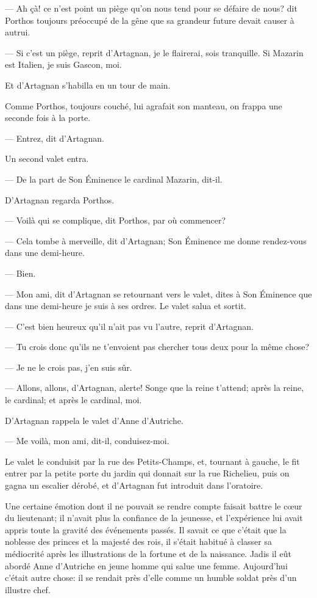 — Ah çà! ce n'est point un piège qu'on nous tend pour se défaire de nous? dit Porthos toujours préoccupé de la gêne que sa grandeur future devait causer à autrui.

— Si c'est un piège, reprit d'Artagnan, je le flairerai, sois tranquille. Si Mazarin est Italien, je suis Gascon, moi.

Et d'Artagnan s'habilla en un tour de main.

Comme Porthos, toujours couché, lui agrafait son manteau, on frappa une seconde fois à la porte.

— Entrez, dit d'Artagnan.

Un second valet entra.

— De la part de Son Éminence le cardinal Mazarin, dit-il.

D'Artagnan regarda Porthos.

— Voilà qui se complique, dit Porthos, par où commencer?

— Cela tombe à merveille, dit d'Artagnan; Son Éminence me donne rendez-vous dans une demi-heure.

— Bien.

— Mon ami, dit d'Artagnan se retournant vers le valet, dites à Son Éminence que dans une demi-heure je suis à ses ordres.
Le valet salua et sortit.

— C'est bien heureux qu'il n'ait pas vu l'autre, reprit d'Artagnan.

— Tu crois donc qu'ils ne t'envoient pas chercher tous deux pour la même chose?

— Je ne le crois pas, j'en suis sûr.

— Allons, allons, d'Artagnan, alerte! Songe que la reine t'attend; après la reine, le cardinal; et après le cardinal, moi.

D'Artagnan rappela le valet d'Anne d'Autriche.

— Me voilà, mon ami, dit-il, conduisez-moi.

Le valet le conduisit par la rue des Petits-Champs, et, tournant à gauche, le fit entrer par la petite porte du jardin qui donnait sur la rue Richelieu, puis on gagna un escalier dérobé, et d'Artagnan fut introduit dans l'oratoire.

Une certaine émotion dont il ne pouvait se rendre compte faisait battre le cœur du lieutenant; il n'avait plus la confiance de la jeunesse, et l'expérience lui avait appris toute la gravité des événements passés. Il savait ce que c'était que la noblesse des princes et la majesté des rois, il s'était habitué à classer sa médiocrité après les illustrations de la fortune et de la naissance. Jadis il eût abordé Anne d'Autriche en jeune homme qui salue une femme. Aujourd'hui c'était autre chose: il se rendait près d'elle comme un humble soldat près d'un illustre chef.

